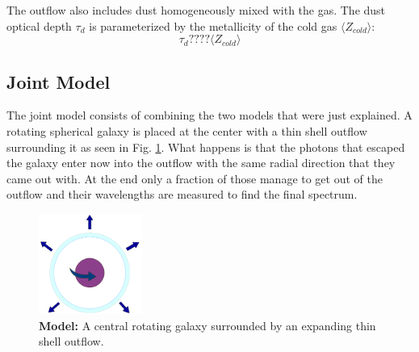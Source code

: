 \documentclass{latex/emulateapj}
\begin{document}
The outflow also includes dust homogeneously mixed with the gas. 
The dust optical depth $\tau_d$ is parameterized by the metallicity of
the cold gas $\langle Z_{cold} \rangle$: 
\begin{equation}
\label{eq:z}
\tau_{d} ???? \langle Z_{cold} \rangle
\end{equation}



\subsection{Joint Model}

The joint model consists of combining the two models that were just
explained. A rotating spherical galaxy is placed at the center with a
thin shell outflow surrounding it as seen in
Fig. \ref{fig:model}. What happens is that the photons that escaped
the galaxy enter now into the outflow with the same radial direction
that they came out with. At the end only a fraction of those manage to
get out of the outflow and their wavelengths are measured to find the
final spectrum. 

\begin{figure}[h!]
\begin{center}
  \includegraphics[width=0.3\textwidth]{./figures/model.png}
\end{center}
\caption{\textbf{Model:} A central rotating galaxy surrounded by an expanding thin shell outflow.
\label{fig:model}}
\end{figure}
\end{document}
